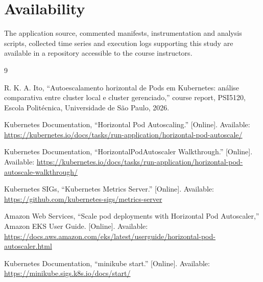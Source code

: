 \documentclass[conference]{IEEEtran}
\begin{document}
\section*{Availability}

The application source, commented manifests, instrumentation and analysis
scripts, collected time series and execution logs supporting this study are
available in a repository accessible to the course instructors.

\begin{thebibliography}{9}

R. K. A. Ito, ``Autoescalamento horizontal de Pods em Kubernetes: an\'alise
comparativa entre cluster local e cluster gerenciado,'' course report, PSI5120,
Escola Polit\'ecnica, Universidade de S\~ao Paulo, 2026.

Kubernetes Documentation, ``Horizontal Pod Autoscaling.'' [Online]. Available:
\url{https://kubernetes.io/docs/tasks/run-application/horizontal-pod-autoscale/}

Kubernetes Documentation, ``HorizontalPodAutoscaler Walkthrough.'' [Online].
Available:
\url{https://kubernetes.io/docs/tasks/run-application/horizontal-pod-autoscale-walkthrough/}

Kubernetes SIGs, ``Kubernetes Metrics Server.'' [Online]. Available:
\url{https://github.com/kubernetes-sigs/metrics-server}

Amazon Web Services, ``Scale pod deployments with Horizontal Pod Autoscaler,''
Amazon EKS User Guide. [Online]. Available:
\url{https://docs.aws.amazon.com/eks/latest/userguide/horizontal-pod-autoscaler.html}

Kubernetes Documentation, ``minikube start.'' [Online]. Available:
\url{https://minikube.sigs.k8s.io/docs/start/}

\end{thebibliography}
\end{document}
